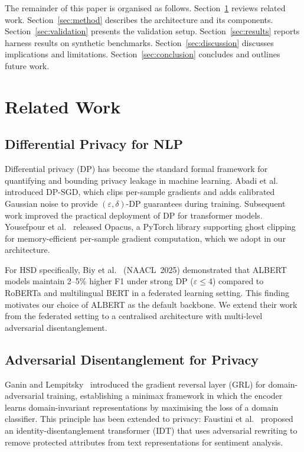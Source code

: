\documentclass{article}
\begin{document}
\noindent
The remainder of this paper is organised as follows.
Section~\ref{sec:related} reviews related work.
Section~\ref{sec:method} describes the architecture and its components.
Section~\ref{sec:validation} presents the validation setup.
Section~\ref{sec:results} reports harness results on synthetic benchmarks.
Section~\ref{sec:discussion} discusses implications and limitations.
Section~\ref{sec:conclusion} concludes and outlines future work.


\section{Related Work}
\label{sec:related}

\subsection{Differential Privacy for NLP}

Differential privacy (DP) has become the standard formal framework for
quantifying and bounding privacy leakage in machine learning.
Abadi et al.~\cite{abadi2016deep} introduced DP-SGD, which clips
per-sample gradients and adds calibrated Gaussian noise to provide
$(\varepsilon,\delta)$-DP guarantees during training.
Subsequent work improved the practical deployment of DP for transformer
models. Yousefpour et al.~\cite{yousefpour2021opacus} released Opacus,
a PyTorch library supporting ghost clipping for memory-efficient
per-sample gradient computation, which we adopt in our architecture.

For HSD specifically, Biy et al.~\cite{biy2025privacy} (NAACL~2025)
demonstrated that ALBERT models maintain 2--5\% higher F1 under strong DP
($\varepsilon\leq4$) compared to RoBERTa and multilingual BERT in a
federated learning setting.
This finding motivates our choice of ALBERT as the default backbone.
We extend their work from the federated setting to a centralised
architecture with multi-level adversarial disentanglement.

\subsection{Adversarial Disentanglement for Privacy}

Ganin and Lempitsky~\cite{ganin2015unsupervised} introduced the gradient
reversal layer (GRL) for domain-adversarial training, establishing a
minimax framework in which the encoder learns domain-invariant
representations by maximising the loss of a domain classifier.
This principle has been extended to privacy: Faustini et
al.~\cite{faustini2025idt} proposed an identity-disentanglement transformer
(IDT) that uses adversarial rewriting to remove protected attributes from
text representations for sentiment analysis.
\end{document}
